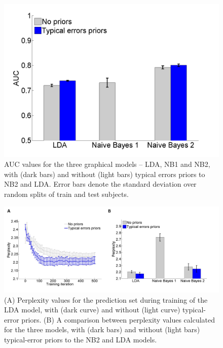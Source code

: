 {{{\begin{figure}[H]
\vspace{.3in}
\includegraphics[width=\linewidth]{Figures/Ch1/AUC}
\caption{AUC values for the three graphical models – LDA, NB1 and NB2, with (dark bars) and without (light bars) typical errors priors to NB2 and LDA. Error bars denote the standard deviation over random splits of train and test subjects.}
\vspace{.3in}
\end{figure}

\begin{figure}
\vspace{.3in}
\includegraphics[width=\textwidth]{Figures/Ch1/figure5AB_HOZ}
\caption{(A) Perplexity values for the prediction set during training of the LDA model, with (dark curve) and without (light curve) typical-error priors. (B) A comparison between perplexity values calculated for the three models, with (dark bars) and without (light bars) typical-error priors to the NB2 and LDA models.}
\vspace{.3in}
\end{figure}

}}}
